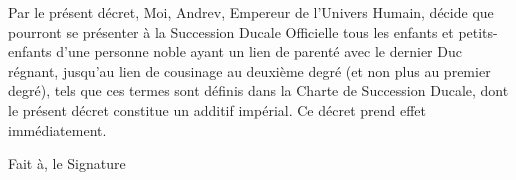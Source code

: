 \documentclass[14pt]{extarticle}
\begin{document}
\begin{framed}
    Par le présent décret, Moi, Andrev, Empereur de l'Univers Humain, décide
    que pourront se présenter à la Succession Ducale Officielle tous les
    enfants et petits-enfants d'une personne noble ayant un lien de parenté
    avec le dernier Duc régnant, jusqu'au lien de cousinage au deuxième degré
    (et non plus au premier degré), tels que ces termes sont définis dans la
    Charte de Succession Ducale, dont le présent décret constitue un additif
    impérial. Ce décret prend effet immédiatement.

    \vspace{7cm}

    \noindent
    Fait à\hspace{4cm}, le \hfill Signature

    \vspace{3cm}

\end{framed}
\end{document}
